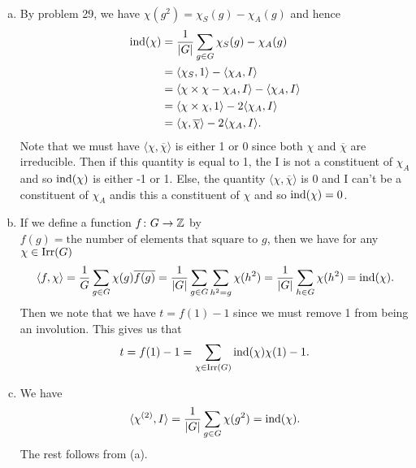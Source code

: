 \documentclass[leqno]{article}
\begin{document}
\begin{solution}~
\begin{enumerate}[(a)]
    \item By problem 29, we have $\chi(g^2)=\chi_S(g)-\chi_A(g)$ and hence
    \begin{align*}
        \mathrm{ind}(\chi) &= \frac{1}{|G|}\sum_{g\in G} \chi_S(g)-\chi_A(g)\\
        &= \langle \chi_S,1\rangle -\langle \chi_A,I\rangle\\
        &= \langle \chi \times \chi-\chi_A,I\rangle -\langle \chi_A,I\rangle\\
        &= \langle \chi \times \chi,1\rangle - 2 \langle \chi_A,I\rangle\\
        &= \langle \chi,\overline{\chi}\rangle -2\langle \chi_A,I\rangle.
    \end{align*}
    Note that we must have $\langle \chi,\overline{\chi}\rangle$ is either 1 or 0 since both $\chi$ and $\overline{\chi}$ are irreducible.  Then if this quantity is equal to 1, the I is not a constituent of $\chi_A$ and so $\mathrm{ind}(\chi)$ is either -1 or 1. Else, the quantity $\langle \chi, \overline{\chi}\rangle$ is 0 and I can't be a constituent of $\chi_A$ andis this a constituent of $\chi$ and so $\mathrm{ind}(\chi)=0$.
    \item If we define a function $f\colon G \to \mathbb{Z}$ by $f(g)=\textrm{the number of elements that square to $g$}$, then we have for any $\chi \in \mathrm{Irr}(G)$
    \[
    \langle f,\chi\rangle = \frac{1}{G} \sum_{g\in G} \chi(g)\overline{f(g)} = \frac{1}{|G|} \sum_{g\in G} \sum_{h^2 =g} \chi(h^2) = \frac{1}{|G|}\sum_{h\in G}\chi(h^2)=\mathrm{ind}(\chi).
    \]
    Then we note that we have $t=f(1)-1$ since we must remove 1 from being an involution. This gives us that
    \[
    t=f(1)-1=\sum_{\chi \in \mathrm{Irr}(G)}\mathrm{ind}(\chi)\chi(1)-1.
    \]
    \item We have
    \[
    \langle \chi^{(2)},I\rangle = \frac{1}{|G|} \sum_{g\in G} \chi(g^2)=\mathrm{ind}(\chi).
    \]
    The rest follows from (a).
\end{enumerate}
\end{solution}
\end{document}
